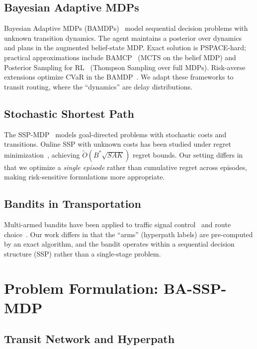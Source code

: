 \documentclass[journal]{IEEEtran}
\begin{document}
\subsection{Bayesian Adaptive MDPs}

Bayesian Adaptive MDPs (BAMDPs)~\cite{duff2002} model sequential decision problems with unknown transition dynamics. The agent maintains a posterior over dynamics and plans in the augmented belief-state MDP. Exact solution is PSPACE-hard; practical approximations include BAMCP~\cite{guez2012} (MCTS on the belief MDP) and Posterior Sampling for RL~\cite{osband2017} (Thompson Sampling over full MDPs). Risk-averse extensions optimize CVaR in the BAMDP~\cite{rigter2021,lin2022}. We adapt these frameworks to transit routing, where the ``dynamics'' are delay distributions.

\subsection{Stochastic Shortest Path}

The SSP-MDP~\cite{bertsekas1991} models goal-directed problems with stochastic costs and transitions. Online SSP with unknown costs has been studied under regret minimization~\cite{rosenberg2020,cohen2021}, achieving $\tilde{O}(B^*\sqrt{SAK})$ regret bounds. Our setting differs in that we optimize a \emph{single episode} rather than cumulative regret across episodes, making risk-sensitive formulations more appropriate.

\subsection{Bandits in Transportation}

Multi-armed bandits have been applied to traffic signal control~\cite{aslani2019} and route choice~\cite{shou2022}. Our work differs in that the ``arms'' (hyperpath labels) are pre-computed by an exact algorithm, and the bandit operates within a sequential decision structure (SSP) rather than a single-stage problem.

\section{Problem Formulation: BA-SSP-MDP}
\label{sec:model}

\subsection{Transit Network and Hyperpath}
\end{document}
